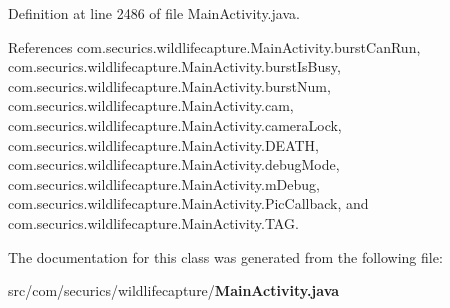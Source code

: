 Definition at line 2486 of file Main\+Activity.\+java.



References com.\+securics.\+wildlifecapture.\+Main\+Activity.\+burst\+Can\+Run, com.\+securics.\+wildlifecapture.\+Main\+Activity.\+burst\+Is\+Busy, com.\+securics.\+wildlifecapture.\+Main\+Activity.\+burst\+Num, com.\+securics.\+wildlifecapture.\+Main\+Activity.\+cam, com.\+securics.\+wildlifecapture.\+Main\+Activity.\+camera\+Lock, com.\+securics.\+wildlifecapture.\+Main\+Activity.\+D\+E\+A\+T\+H, com.\+securics.\+wildlifecapture.\+Main\+Activity.\+debug\+Mode, com.\+securics.\+wildlifecapture.\+Main\+Activity.\+m\+Debug, com.\+securics.\+wildlifecapture.\+Main\+Activity.\+Pic\+Callback, and com.\+securics.\+wildlifecapture.\+Main\+Activity.\+T\+A\+G.



The documentation for this class was generated from the following file\+:\begin{DoxyCompactItemize}
\item 
src/com/securics/wildlifecapture/{\bf Main\+Activity.\+java}\end{DoxyCompactItemize}
